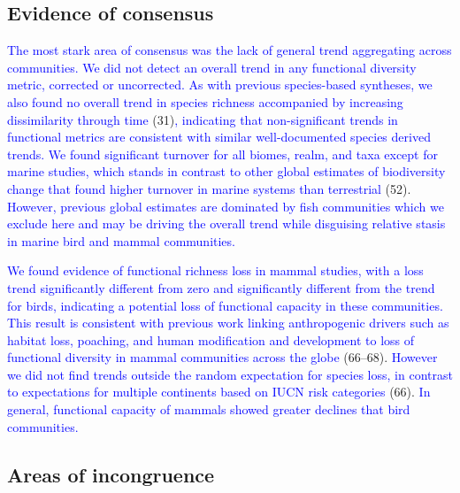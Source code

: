 \documentclass{article}
\begin{document}
\hypertarget{evidence-of-consensus}{%
\subsection{Evidence of consensus}\label{evidence-of-consensus}}

\textcolor{blue}{The most stark area of consensus was the lack of general trend aggregating across communities. We did not detect an overall trend in any functional diversity metric, corrected or uncorrected. As with previous species-based syntheses, we also found no overall trend in species richness accompanied by increasing dissimilarity through time}
(31)\textcolor{blue}{, indicating that non-significant trends in functional metrics are consistent with similar well-documented species derived trends. We found significant turnover for all biomes, realm, and taxa except for marine studies, which stands in contrast to other global estimates of biodiversity change that found higher turnover in marine systems than terrestrial}
(52).
\textcolor{blue}{However, previous global estimates are dominated by fish communities which we exclude here and may be driving the overall trend while disguising relative stasis in marine bird and mammal communities.}

\textcolor{blue}{We found evidence of functional richness loss in mammal studies, with a loss trend significantly different from zero and significantly different from the trend for birds, indicating a potential loss of functional capacity in these communities. This result is consistent with previous work linking anthropogenic drivers such as habitat loss, poaching, and human modification and development to loss of functional diversity in mammal communities across the globe}
(66--68).
\textcolor{blue}{However we did not find trends outside the random expectation for species loss, in contrast to expectations for multiple continents based on IUCN risk categories}
(66).
\textcolor{blue}{In general, functional capacity of mammals showed greater declines that bird communities.}

\hypertarget{areas-of-incongruence}{%
\subsection{Areas of incongruence}\label{areas-of-incongruence}}
\end{document}
